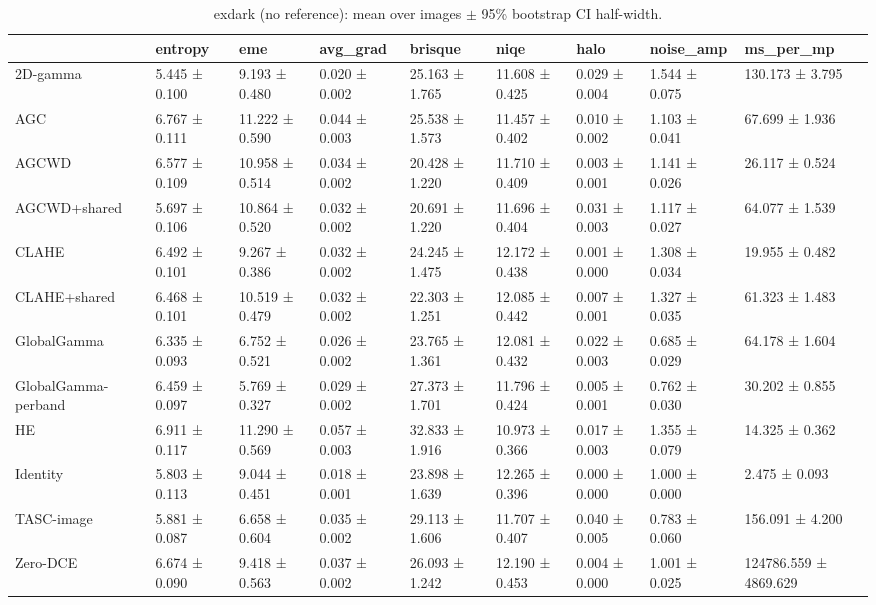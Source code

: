 \begin{table}[t]
\caption{exdark (no reference): mean over images $\pm$ 95\% bootstrap CI half-width.}
\label{tab:exdark_summary}
\begin{tabular}{lllllllll}
\toprule
 & entropy & eme & avg\_grad & brisque & niqe & halo & noise\_amp & ms\_per\_mp \\
\midrule
2D-gamma & 5.445 ± 0.100 & 9.193 ± 0.480 & 0.020 ± 0.002 & 25.163 ± 1.765 & 11.608 ± 0.425 & 0.029 ± 0.004 & 1.544 ± 0.075 & 130.173 ± 3.795 \\
AGC & 6.767 ± 0.111 & 11.222 ± 0.590 & 0.044 ± 0.003 & 25.538 ± 1.573 & 11.457 ± 0.402 & 0.010 ± 0.002 & 1.103 ± 0.041 & 67.699 ± 1.936 \\
AGCWD & 6.577 ± 0.109 & 10.958 ± 0.514 & 0.034 ± 0.002 & 20.428 ± 1.220 & 11.710 ± 0.409 & 0.003 ± 0.001 & 1.141 ± 0.026 & 26.117 ± 0.524 \\
AGCWD+shared & 5.697 ± 0.106 & 10.864 ± 0.520 & 0.032 ± 0.002 & 20.691 ± 1.220 & 11.696 ± 0.404 & 0.031 ± 0.003 & 1.117 ± 0.027 & 64.077 ± 1.539 \\
CLAHE & 6.492 ± 0.101 & 9.267 ± 0.386 & 0.032 ± 0.002 & 24.245 ± 1.475 & 12.172 ± 0.438 & 0.001 ± 0.000 & 1.308 ± 0.034 & 19.955 ± 0.482 \\
CLAHE+shared & 6.468 ± 0.101 & 10.519 ± 0.479 & 0.032 ± 0.002 & 22.303 ± 1.251 & 12.085 ± 0.442 & 0.007 ± 0.001 & 1.327 ± 0.035 & 61.323 ± 1.483 \\
GlobalGamma & 6.335 ± 0.093 & 6.752 ± 0.521 & 0.026 ± 0.002 & 23.765 ± 1.361 & 12.081 ± 0.432 & 0.022 ± 0.003 & 0.685 ± 0.029 & 64.178 ± 1.604 \\
GlobalGamma-perband & 6.459 ± 0.097 & 5.769 ± 0.327 & 0.029 ± 0.002 & 27.373 ± 1.701 & 11.796 ± 0.424 & 0.005 ± 0.001 & 0.762 ± 0.030 & 30.202 ± 0.855 \\
HE & 6.911 ± 0.117 & 11.290 ± 0.569 & 0.057 ± 0.003 & 32.833 ± 1.916 & 10.973 ± 0.366 & 0.017 ± 0.003 & 1.355 ± 0.079 & 14.325 ± 0.362 \\
Identity & 5.803 ± 0.113 & 9.044 ± 0.451 & 0.018 ± 0.001 & 23.898 ± 1.639 & 12.265 ± 0.396 & 0.000 ± 0.000 & 1.000 ± 0.000 & 2.475 ± 0.093 \\
TASC-image & 5.881 ± 0.087 & 6.658 ± 0.604 & 0.035 ± 0.002 & 29.113 ± 1.606 & 11.707 ± 0.407 & 0.040 ± 0.005 & 0.783 ± 0.060 & 156.091 ± 4.200 \\
Zero-DCE & 6.674 ± 0.090 & 9.418 ± 0.563 & 0.037 ± 0.002 & 26.093 ± 1.242 & 12.190 ± 0.453 & 0.004 ± 0.000 & 1.001 ± 0.025 & 124786.559 ± 4869.629 \\
\bottomrule
\end{tabular}
\end{table}
